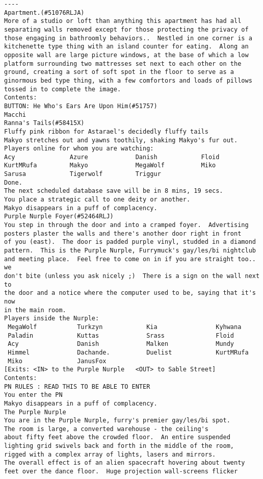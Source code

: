 \begin{verbatim}
----
Apartment.(#51076RLJA)
More of a studio or loft than anything this apartment has had all separating walls removed except for those protecting the privacy of those engaging in bathroomly behaviors..  Nestled in one corner is a kitchenette type thing with an island counter for eating.  Along an opposite wall are large picture windows, at the base of which a low platform surrounding two mattresses set next to each other on the ground, creating a sort of soft spot in the floor to serve as a ginormous bed type thing, with a few comfortors and loads of pillows tossed in to complete the image.
Contents:
BUTTON: He Who's Ears Are Upon Him(#51757)
Macchi
Ranna's Tails(#58415X)
Fluffy pink ribbon for Astarael's decidedly fluffy tails
Makyo stretches out and yawns toothily, shaking Makyo's fur out.
Players online for whom you are watching:
Acy               Azure             Danish            Floid
KurtMRufa         Makyo             MegaWolf          Miko
Sarusa            Tigerwolf         Triggur
Done.
The next scheduled database save will be in 8 mins, 19 secs.
You place a strategic call to one deity or another.
Makyo disappears in a puff of complacency.
Purple Nurple Foyer(#52464RLJ)
You step in through the door and into a cramped foyer.  Advertising
posters plaster the walls and there's another door right in front
of you (east).  The door is padded purple vinyl, studded in a diamond
pattern.  This is the Purple Nurple, Furrymuck's gay/les/bi nightclub
and meeting place.  Feel free to come on in if you are straight too.. we
don't bite (unless you ask nicely ;)  There is a sign on the wall next to
the door and a notice where the computer used to be, saying that it's now
in the main room.
Players inside the Nurple:
 MegaWolf           Turkzyn            Kia                Kyhwana
 Paladin            Kuttas             Srass              Floid
 Acy                Danish             Malken             Mundy
 Himmel             Dachande.          Duelist            KurtMRufa
 Miko               JanusFox
[Exits: <IN> to the Purple Nurple   <OUT> to Sable Street]
Contents:
PN RULES : READ THIS TO BE ABLE TO ENTER
You enter the PN
Makyo disappears in a puff of complacency.
The Purple Nurple
You are in the Purple Nurple, furry's premier gay/les/bi spot.
The room is large, a converted warehouse - the ceiling's
about fifty feet above the crowded floor.  An entire suspended
lighting grid swivels back and forth in the middle of the room,
rigged with a complex array of lights, lasers and mirrors.
The overall effect is of an alien spacecraft hovering about twenty
feet over the dance floor.  Huge projection wall-screens flicker

\end{verbatim}
